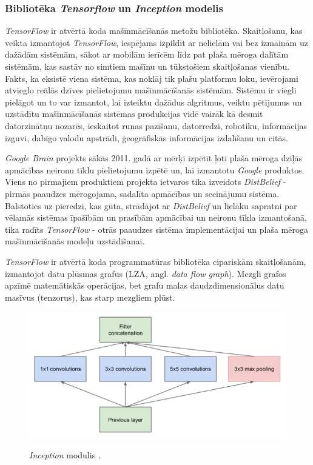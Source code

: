 \documentclass[12pt,paper=a4]{report}
\begin{document}
\subsubsection{Bibliotēka \textit{Tensorflow} un \textit{Inception} modelis} \textit{TensorFlow} ir atvērtā koda mašīnmācīšanās metožu bibliotēka. Skaitļošanu, kas veikta izmantojot \textit{TensorFlow}, iespējams izpildīt ar nelielām vai bez izmaiņām uz dažādām sistēmām, sākot ar mobilām ierīcēm līdz pat plaša mēroga dalītām sistēmām, kas sastāv no simtiem mašīnu un tūkstošiem skaitļošanas vienību. Fakts, ka eksistē viena sistēma, kas noklāj tik plašu platformu loku, ievērojami atvieglo reālās dzīves pielietojumu mašīnmācīšanās sistēmām. Sistēmu ir viegli pielāgot un to var izmantot, lai izteiktu dažādus algritmus, veiktu pētījumus un uzstādītu mašīnmācīšanās sistēmas produkcijas vidē vairāk kā desmit datorzinātņu nozarēs, ieskaitot runas pazīšanu, datorredzi, robotiku, informācijas izguvi, dabīgo valodu apstrādi, ģeogrāfiskās informācijas izdalīšanu un citās. \cite{tensorflow}\par
\textit{Google Brain} projekts sākās 2011. gadā ar mērķi izpētīt ļoti plaša mēroga dziļās apmācības neironu tīklu pielietojumu izpētē un, lai izmantotu \textit{Google} produktos. Viens no pirmajiem produktiem projekta ietvaros tika izveidots \textit{DistBelief} - pirmās paaudzes mērogojama, sadalīta apmācības un secinājumu sistēma. Balstoties uz pieredzi, kas gūta, strādājot ar \textit{DistBelief} un lielāku sapratni par vēlamās sistēmas īpašībām un prasībām apmācībai un neironu tīkla izmantošanā, tika radīts \textit{TensorFlow} - otrās paaudzes sistēma implementācijai un plaša mēroga mašīnmācīšanās modeļu uzstādīšanai. \cite{tensorflow}\par
\textit{TensorFlow} ir atvērtā koda programmatūras bibliotēka cipariskām skaitļošanām, izmantojot datu plūsmas grafus (LZA, angl. \textit{data flow graph}). Mezgli grafos apzīmē matemātiskās operācijas, bet grafu malas daudzdimensionālus datu masīvus (tenzorus), kas starp mezgliem plūst. \cite{tensorflow}\par
\begin{figure}[h!]
\centering
\includegraphics[width=.7\linewidth]{inception1}
\label{fig:inception1}
\caption{\textit{Inception} modulis \cite{inception}.}
\end{figure}
\end{document}
